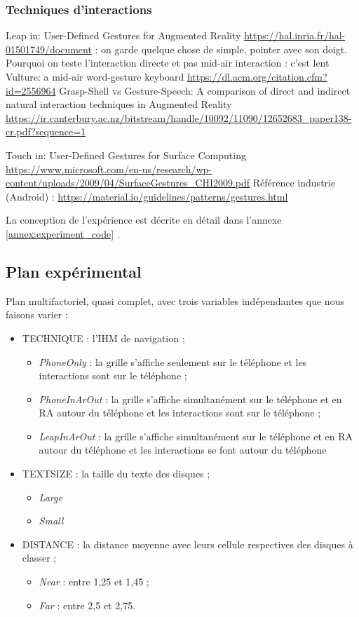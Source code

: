 \subsubsection{Techniques d'interactions}
Leap in:
User-Defined Gestures for Augmented Reality \url{https://hal.inria.fr/hal-01501749/document} : on garde quelque chose de simple, pointer avec son doigt.
Pourquoi on teste l'interaction directe et pas mid-air interaction : c'est lent Vulture: a mid-air word-gesture keyboard \url{https://dl.acm.org/citation.cfm?id=2556964}
Grasp-Shell vs Gesture-Speech: A comparison of direct and indirect natural interaction
techniques in Augmented Reality \url{https://ir.canterbury.ac.nz/bitstream/handle/10092/11090/12652683_paper138-cr.pdf?sequence=1}

Touch in:
User-Defined Gestures for Surface Computing \url{https://www.microsoft.com/en-us/research/wp-content/uploads/2009/04/SurfaceGestures_CHI2009.pdf}
Référence industrie (Android) : \url{https://material.io/guidelines/patterns/gestures.html}

La conception de l'expérience est décrite en détail dans l'annexe \ref{annex:experiment_code} .

\subsection{Plan expérimental}
Plan multifactoriel, quasi complet, avec trois variables indépendantes que nous faisons varier :
\begin{itemize}
  \item \textsc{TECHNIQUE} : l'IHM de navigation ;
  \begin{itemize}
    \item \textit{PhoneOnly} : la grille s'affiche seulement sur le téléphone et les interactions sont sur le téléphone ;
    \item \textit{PhoneInArOut} : la grille s'affiche simultanément sur le téléphone et en RA autour du téléphone et les interactions sont sur le téléphone ;
    \item \textit{LeapInArOut} : la grille s'affiche simultanément sur le téléphone et en RA autour du téléphone et les interactions se font autour du téléphone
  \end{itemize}
  \item \textsc{TEXTSIZE} : la taille du texte des disques ;
  \begin{itemize}
    \item \textit{Large}
    \item \textit{Small}
  \end{itemize}
  \item \textsc{DISTANCE} : la distance moyenne avec leurs cellule respectives des disques à classer ;
  \begin{itemize}
    \item \textit{Near} : entre 1,25 et 1,45 ;
    \item \textit{Far} : entre 2,5 et 2,75.
  \end{itemize}
\end{itemize}

